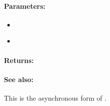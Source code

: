 \paragraph{Parameters:}
\begin{itemize}[noitemsep]
\item {}\\

\item {}\\

\end{itemize}

\paragraph{Returns:}


\paragraph{See also:}  This is the asynchronous form of .
